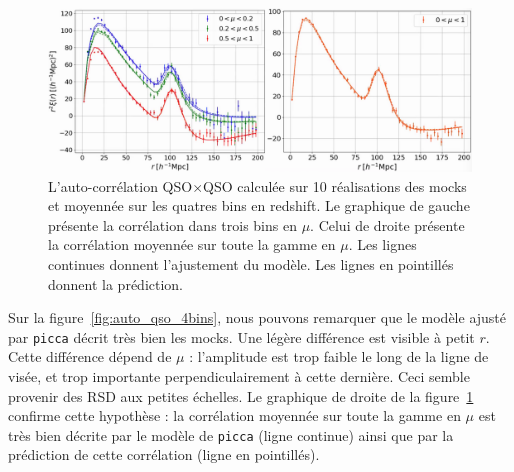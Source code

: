 \begin{figure}
  \centering
  \includegraphics[scale=0.4]{auto_qso}
  \caption{L'auto-corrélation QSO$\times$QSO calculée sur 10 réalisations des mocks et moyennée sur les quatres bins en redshift. Le graphique de gauche présente la corrélation dans trois bins en $\mu$. Celui de droite présente la corrélation moyennée sur toute la gamme en $\mu$. Les lignes continues donnent l'ajustement du modèle. Les lignes en pointillés donnent la prédiction.}
  \label{fig:auto_qso}
\end{figure}

Sur la figure~\ref{fig:auto_qso_4bins}, nous pouvons remarquer que le modèle ajusté par \texttt{picca} décrit très bien les mocks. Une légère différence est visible à petit $r$. Cette différence dépend de $\mu$ : l'amplitude est trop faible le long de la ligne de visée, et trop importante perpendiculairement à cette dernière. Ceci semble provenir des RSD aux petites échelles.
Le graphique de droite de la figure~\ref{fig:auto_qso} confirme cette hypothèse : la corrélation moyennée sur toute la gamme en $\mu$ est très bien décrite par le modèle de \texttt{picca} (ligne continue) ainsi que par la prédiction de cette corrélation (ligne en pointillés).


